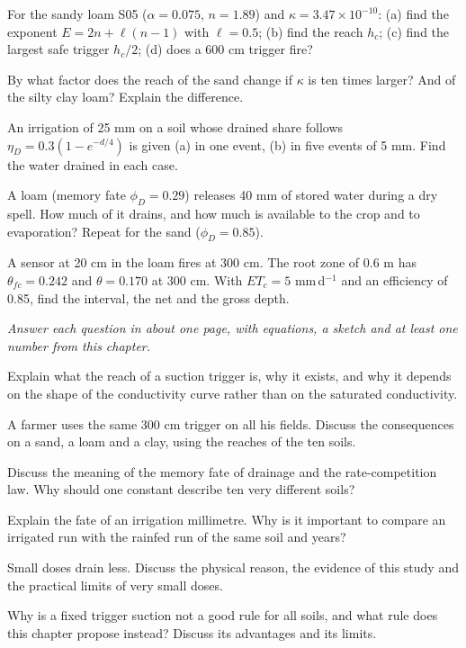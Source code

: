 \begin{exlist}
\item For the sandy loam S05 ($\alpha=0.075$, $n=1.89$) and $\kappa=3.47\times10^{-10}$: (a) find the exponent $E=2n+\ell(n-1)$ with $\ell=0.5$; (b) find the reach $h_c$; (c) find the largest safe trigger $h_c/2$; (d) does a 600 cm trigger fire?
\item By what factor does the reach of the sand change if $\kappa$ is ten times larger? And of the silty clay loam? Explain the difference.
\item An irrigation of 25 mm on a soil whose drained share follows $\eta_D=0.3(1-e^{-d/4})$ is given (a) in one event, (b) in five events of 5 mm. Find the water drained in each case.
\item A loam (memory fate $\phi_D=0.29$) releases 40 mm of stored water during a dry spell. How much of it drains, and how much is available to the crop and to evaporation? Repeat for the sand ($\phi_D=0.85$).
\item A sensor at 20 cm in the loam fires at 300 cm. The root zone of 0.6 m has $\theta_{fc}=0.242$ and $\theta=0.170$ at 300 cm. With $ET_c=5$ mm\,d$^{-1}$ and an efficiency of 0.85, find the interval, the net and the gross depth.
\end{exlist}
{\small\itshape Answer each question in about one page, with equations, a sketch and at least one number from this chapter.}\par\vspace{3pt}
\begin{exlist}
\item Explain what the reach of a suction trigger is, why it exists, and why it depends on the shape of the conductivity curve rather than on the saturated conductivity.
\item A farmer uses the same 300 cm trigger on all his fields. Discuss the consequences on a sand, a loam and a clay, using the reaches of the ten soils.
\item Discuss the meaning of the memory fate of drainage and the rate-competition law. Why should one constant describe ten very different soils?
\item Explain the fate of an irrigation millimetre. Why is it important to compare an irrigated run with the rainfed run of the same soil and years?
\item Small doses drain less. Discuss the physical reason, the evidence of this study and the practical limits of very small doses.
\item Why is a fixed trigger suction not a good rule for all soils, and what rule does this chapter propose instead? Discuss its advantages and its limits.
\end{exlist}
